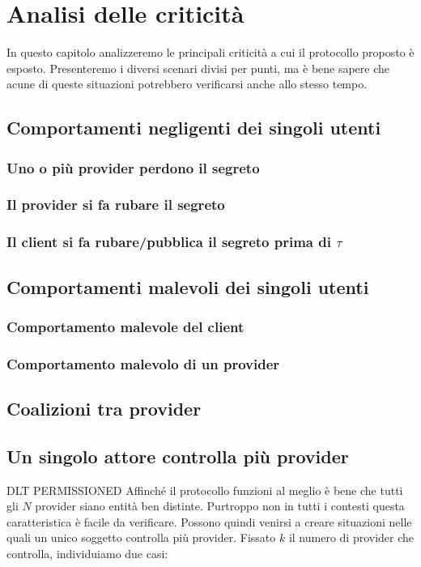 \chapter{Analisi delle criticità}
\label{chap:analisi-attacchi}
In questo capitolo analizzeremo le principali criticità a cui il protocollo
proposto è esposto. Presenteremo i diversi scenari divisi per punti, ma è bene
sapere che acune di queste situazioni potrebbero verificarsi anche allo stesso
tempo.

\section{Comportamenti negligenti dei singoli utenti}
\subsection{Uno o più provider perdono il segreto}


\subsection{Il provider si fa rubare il segreto}

\subsection{Il client si fa rubare/pubblica il segreto prima di $ \tau $}


\section{Comportamenti malevoli dei singoli utenti}
\subsection{Comportamento malevole del client}

\subsection{Comportamento malevolo di un provider}


\section{Coalizioni tra provider}


\section{Un singolo attore controlla più provider}
DLT PERMISSIONED
Affinché il protocollo funzioni al meglio
è bene che tutti gli $ N $ provider
siano entità ben distinte. Purtroppo non in tutti i contesti
questa caratteristica è facile da verificare.
Possono quindi venirsi a creare situazioni nelle quali un unico soggetto controlla
più provider. Fissato $ k $ il numero di provider che controlla,
individuiamo due casi:
